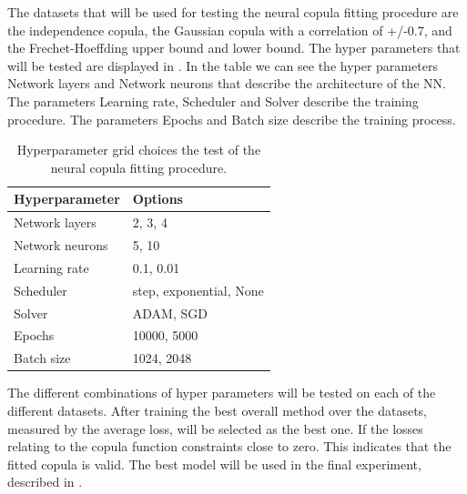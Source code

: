 The datasets that will be used for testing the neural copula fitting procedure are the independence copula, the Gaussian copula with a correlation of +/-0.7, and the Frechet-Hoeffding upper bound and lower bound. The hyper parameters that will be tested are displayed in . In the table we can see the hyper parameters Network layers and Network neurons that describe the architecture of the \gls{NN}. The parameters Learning rate, Scheduler and Solver describe the training procedure. The parameters Epochs and Batch size describe the training process. 

\begin{table}[h!]
    \centering
    \caption{Hyperparameter grid choices the test of the neural copula fitting procedure.}
    \begin{tabular}{ll}
    \textbf{Hyperparameter} & \textbf{Options} \\
    \hline
    Network layers & 2, 3, 4 \\
    Network neurons & 5, 10 \\
    Learning rate & 0.1, 0.01 \\
    Scheduler & step, exponential, None \\
    Solver & ADAM, SGD \\
    Epochs & 10000, 5000 \\
    Batch size & 1024, 2048 \\
    \end{tabular}
    \label{tab:se_hyperparams}
\end{table}
    



The different combinations of hyper parameters will be tested on each of the different datasets. After training the best overall method over the datasets, measured by the average loss, will be selected as the best one. If the losses relating to the copula function constraints close to zero. This indicates that the fitted copula is valid. The best model will be used in the final experiment, described in .  

 
